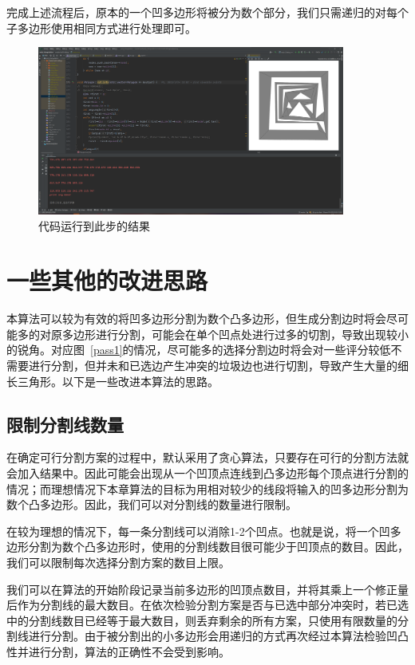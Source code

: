 完成上述流程后，原本的一个凹多边形将被分为数个部分，我们只需递归的对每个子多边形使用相同方式进行处理即可。

\begin{figure}[htp]
    \centering
    \includegraphics[width=0.9\textwidth]
    {figures/output.png}
    \caption{代码运行到此步的结果}
  \end{figure}

\section{一些其他的改进思路}
本算法可以较为有效的将凹多边形分割为数个凸多边形，但生成分割边时将会尽可能多的对原多边形进行分割，可能会在单个凹点处进行过多的切割，导致出现较小的锐角。对应图~\ref*{pass1}的情况，尽可能多的选择分割边时将会对一些评分较低不需要进行分割，但并未和已选边产生冲突的垃圾边也进行切割，导致产生大量的细长三角形。以下是一些改进本算法的思路。

\subsection{限制分割线数量}
在确定可行分割方案的过程中，默认采用了贪心算法，只要存在可行的分割方法就会加入结果中。因此可能会出现从一个凹顶点连线到凸多边形每个顶点进行分割的情况；而理想情况下本章算法的目标为用相对较少的线段将输入的凹多边形分割为数个凸多边形。因此，我们可以对分割线的数量进行限制。

在较为理想的情况下，每一条分割线可以消除1-2个凹点。也就是说，将一个凹多边形分割为数个凸多边形时，使用的分割线数目很可能少于凹顶点的数目。因此，我们可以限制每次选择分割方案的数目上限。

我们可以在算法的开始阶段记录当前多边形的凹顶点数目，并将其乘上一个修正量后作为分割线的最大数目。在依次检验分割方案是否与已选中部分冲突时，若已选中的分割线数目已经等于最大数目，则丢弃剩余的所有方案，只使用有限数量的分割线进行分割。由于被分割出的小多边形会用递归的方式再次经过本算法检验凹凸性并进行分割，算法的正确性不会受到影响。

